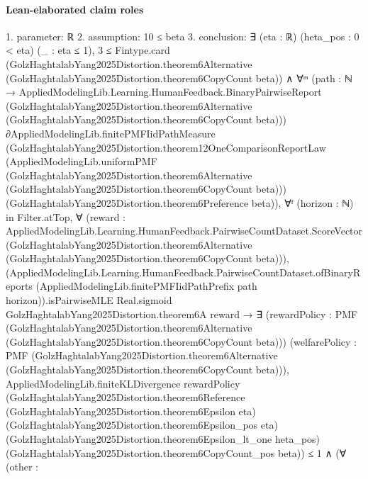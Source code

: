 \documentclass[10pt]{article}
\begin{document}
\paragraph{Lean-elaborated claim roles}\begin{ReviewVerbatim}
1. parameter: ℝ
2. assumption: 10 ≤ beta
3. conclusion: ∃ (eta : ℝ) (heta_pos : 0 < eta) (_ : eta ≤ 1),
  3 ≤
      Fintype.card
        (GolzHaghtalabYang2025Distortion.theorem6Alternative (GolzHaghtalabYang2025Distortion.theorem6CopyCount beta)) ∧
    ∀ᵐ (path :
      ℕ →
        AppliedModelingLib.Learning.HumanFeedback.BinaryPairwiseReport
          (GolzHaghtalabYang2025Distortion.theorem6Alternative
            (GolzHaghtalabYang2025Distortion.theorem6CopyCount
              beta))) ∂AppliedModelingLib.finitePMFIidPathMeasure
        (GolzHaghtalabYang2025Distortion.theorem12OneComparisonReportLaw
          (AppliedModelingLib.uniformPMF
            (GolzHaghtalabYang2025Distortion.theorem6Alternative
              (GolzHaghtalabYang2025Distortion.theorem6CopyCount beta)))
          (GolzHaghtalabYang2025Distortion.theorem6Preference beta)),
      ∀ᶠ (horizon : ℕ) in Filter.atTop,
        ∀
          (reward :
            AppliedModelingLib.Learning.HumanFeedback.PairwiseCountDataset.ScoreVector
              (GolzHaghtalabYang2025Distortion.theorem6Alternative
                (GolzHaghtalabYang2025Distortion.theorem6CopyCount beta))),
          (AppliedModelingLib.Learning.HumanFeedback.PairwiseCountDataset.ofBinaryReports
                  (AppliedModelingLib.finitePMFIidPathPrefix path horizon)).isPairwiseMLE
              Real.sigmoid GolzHaghtalabYang2025Distortion.theorem6A reward →
            ∃ (rewardPolicy :
              PMF
                (GolzHaghtalabYang2025Distortion.theorem6Alternative
                  (GolzHaghtalabYang2025Distortion.theorem6CopyCount beta)))
              (welfarePolicy :
              PMF
                (GolzHaghtalabYang2025Distortion.theorem6Alternative
                  (GolzHaghtalabYang2025Distortion.theorem6CopyCount beta))),
              AppliedModelingLib.finiteKLDivergence rewardPolicy
                    (GolzHaghtalabYang2025Distortion.theorem6Reference
                      (GolzHaghtalabYang2025Distortion.theorem6Epsilon eta)
                      (GolzHaghtalabYang2025Distortion.theorem6Epsilon_pos eta)
                      (GolzHaghtalabYang2025Distortion.theorem6Epsilon_lt_one heta_pos)
                      (GolzHaghtalabYang2025Distortion.theorem6CopyCount_pos beta)) ≤
                  1 ∧
                (∀
                    (other :

\end{ReviewVerbatim}
\end{document}
